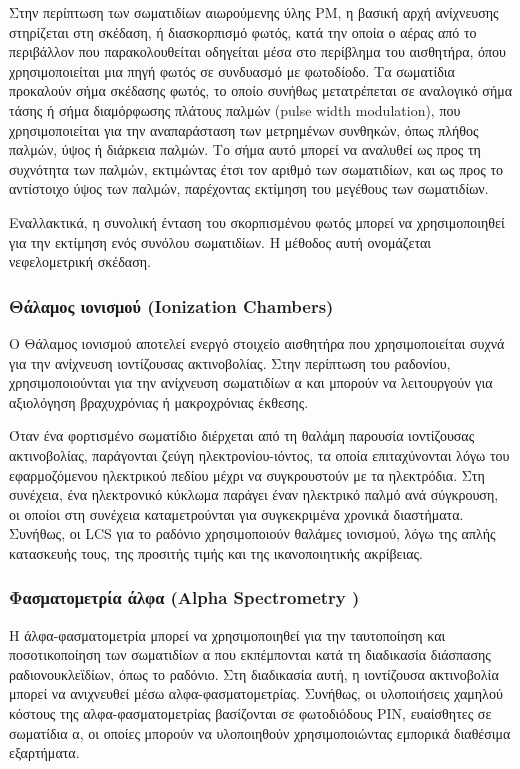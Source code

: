 Στην περίπτωση των σωματιδίων αιωρούμενης ύλης PM, η βασική αρχή ανίχνευσης στηρίζεται στη σκέδαση, ή διασκορπισμό φωτός, 
κατά την οποία ο αέρας από το περιβάλλον που παρακολουθείται οδηγείται μέσα στο περίβλημα του αισθητήρα,
όπου χρησιμοποιείται μια πηγή φωτός σε συνδυασμό με φωτοδίοδο.
Τα σωματίδια προκαλούν σήμα σκέδασης φωτός, το οποίο συνήθως μετατρέπεται σε αναλογικό σήμα τάσης ή σήμα διαμόρφωσης πλάτους παλμών (pulse width modulation),
που χρησιμοποιείται για την αναπαράσταση των μετρημένων συνθηκών, όπως πλήθος παλμών, ύψος ή διάρκεια παλμών. Το σήμα αυτό μπορεί να αναλυθεί ως προς τη συχνότητα των παλμών,
εκτιμώντας έτσι τον αριθμό των σωματιδίων, και ως προς το αντίστοιχο ύψος των παλμών, παρέχοντας εκτίμηση του μεγέθους των σωματιδίων.

Εναλλακτικά, η συνολική ένταση του σκορπισμένου φωτός μπορεί να χρησιμοποιηθεί για την εκτίμηση ενός συνόλου σωματιδίων. 
Η μέθοδος αυτή ονομάζεται νεφελομετρική σκέδαση.

\subsubsection{Θάλαμος ιονισμού (Ionization Chambers)}

Ο Θάλαμος ιονισμού αποτελεί ενεργό στοιχείο αισθητήρα που χρησιμοποιείται συχνά για την ανίχνευση ιοντίζουσας ακτινοβολίας.
Στην περίπτωση του ραδονίου, χρησιμοποιούνται για την ανίχνευση σωματιδίων α και μπορούν να λειτουργούν για αξιολόγηση βραχυχρόνιας ή μακροχρόνιας έκθεσης.

Όταν ένα φορτισμένο σωματίδιο διέρχεται από τη θαλάμη παρουσία ιοντίζουσας ακτινοβολίας, παράγονται ζεύγη ηλεκτρονίου-ιόντος,
τα οποία επιταχύνονται λόγω του εφαρμοζόμενου ηλεκτρικού πεδίου μέχρι να συγκρουστούν με τα ηλεκτρόδια.
Στη συνέχεια, ένα ηλεκτρονικό κύκλωμα παράγει έναν ηλεκτρικό παλμό ανά σύγκρουση, οι οποίοι στη συνέχεια καταμετρούνται για συγκεκριμένα χρονικά διαστήματα.
Συνήθως, οι LCS για το ραδόνιο χρησιμοποιούν θαλάμες ιονισμού, λόγω της απλής κατασκευής τους, της προσιτής τιμής και της ικανοποιητικής ακρίβειας.

\subsubsection{Φασματομετρία άλφα (Alpha Spectrometry )}

Η άλφα-φασματομετρία μπορεί να χρησιμοποιηθεί για την ταυτοποίηση και ποσοτικοποίηση των σωματιδίων α που εκπέμπονται κατά τη διαδικασία διάσπασης ραδιονουκλεϊδίων, όπως το ραδόνιο.
Στη διαδικασία αυτή, η ιοντίζουσα ακτινοβολία μπορεί να ανιχνευθεί μέσω αλφα-φασματομετρίας.
Συνήθως, οι υλοποιήσεις χαμηλού κόστους της αλφα-φασματομετρίας βασίζονται σε φωτοδιόδους PIN, ευαίσθητες σε σωματίδια α, οι οποίες μπορούν να υλοποιηθούν χρησιμοποιώντας εμπορικά διαθέσιμα εξαρτήματα.
